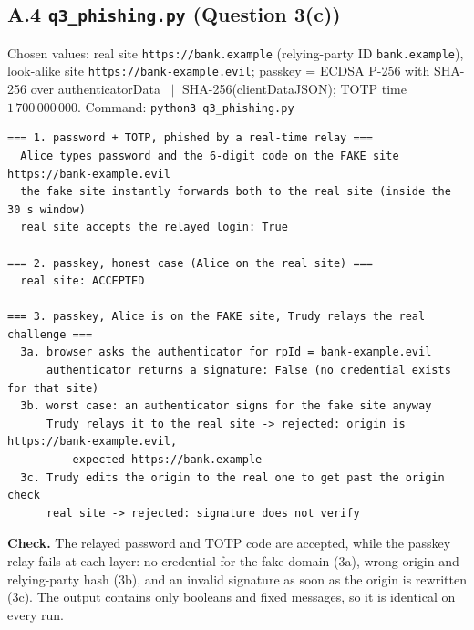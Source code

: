 \documentclass[11pt,a4paper]{article}
\begin{document}
\needspace{11.8cm}
\subsection*{A.4 \texttt{q3\_phishing.py} (Question 3(c))}
Chosen values: real site \texttt{https://bank.example} (relying-party ID \texttt{bank.example}), look-alike site
\texttt{https://bank-example.evil}; passkey = ECDSA P-256 with SHA-256 over
authenticatorData $\|$ SHA-256(clientDataJSON); TOTP time $1\,700\,000\,000$.
Command: \texttt{python3 q3\_phishing.py}
\begin{Verbatim}[fontsize=\footnotesize, frame=single]
=== 1. password + TOTP, phished by a real-time relay ===
  Alice types password and the 6-digit code on the FAKE site https://bank-example.evil
  the fake site instantly forwards both to the real site (inside the 30 s window)
  real site accepts the relayed login: True

=== 2. passkey, honest case (Alice on the real site) ===
  real site: ACCEPTED

=== 3. passkey, Alice is on the FAKE site, Trudy relays the real challenge ===
  3a. browser asks the authenticator for rpId = bank-example.evil
      authenticator returns a signature: False (no credential exists for that site)
  3b. worst case: an authenticator signs for the fake site anyway
      Trudy relays it to the real site -> rejected: origin is https://bank-example.evil,
          expected https://bank.example
  3c. Trudy edits the origin to the real one to get past the origin check
      real site -> rejected: signature does not verify
\end{Verbatim}
\textbf{Check.} The relayed password and TOTP code are accepted, while the passkey relay fails at each layer:
no credential for the fake domain (3a), wrong origin and relying-party hash (3b), and an invalid signature as
soon as the origin is rewritten (3c). The output contains only booleans and fixed messages, so it is identical on
every run.

\needspace{21.8cm}
\end{document}
